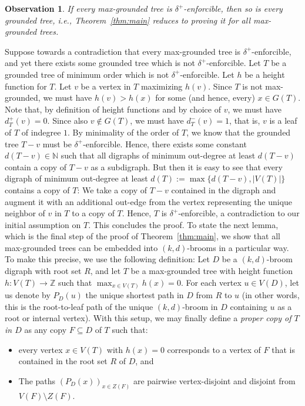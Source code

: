\documentclass[a4paper,11pt]{article}
\makeatletter
\renewenvironment{proof}[1][\proofname] {\par\pushQED{\qed}\normalfont\topsep6\p@\@plus6\p@\relax\trivlist\item[\hskip\labelsep\bfseries#1\@addpunct{.}]\ignorespaces}{\popQED\endtrivlist\@endpefalse}
\newtheorem{observation}[theorem]{\bf Observation}
\theoremstyle{definition}
\makeatother
\begin{document}
\begin{observation}\label{obs:obvious}
If every max-grounded tree is $\delta^+$-enforcible, then so is every grounded tree, i.e., Theorem~\ref{thm:main} reduces to proving it for all max-grounded trees.
\end{observation}
\begin{proof}
    Suppose towards a contradiction that every max-grounded tree is $\delta^+$-enforcible, and yet there exists some grounded tree which is not $\delta^+$-enforcible. Let $T$ be a grounded tree of minimum order which is not $\delta^+$-enforcible. Let $h$ be a height function for $T$. Let $v$ be a vertex in $T$ maximizing $h(v)$. Since $T$ is not max-grounded, we must have $h(v)>h(x)$ for some (and hence, every) $x\in G(T)$. Note that, by definition of height functions and by choice of $v$, we must have $d_T^+(v)=0$. Since also $v\notin G(T)$, we must have $d_T^-(v)=1$, that is, $v$ is a leaf of $T$ of indegree $1$. By minimality of the order of $T$, we know that the grounded tree $T-v$ must be $\delta^+$-enforcible. Hence, there exists some constant $d(T-v)\in \mathbb{N}$ such that all digraphs of minimum out-degree at least $d(T-v)$ contain a copy of $T-v$ as a subdigraph. But then it is easy to see that every digraph of minimum out-degree at least $d(T):=\max\{d(T-v),|V(T)|\}$ contains a copy of $T$: We take a copy of $T-v$ contained in the digraph and augment it with an additional out-edge from the vertex representing the unique neighbor of $v$ in $T$ to a copy of $T$. Hence, $T$ is $\delta^+$-enforcible, a contradiction to our initial assumption on $T$. This concludes the proof. 
\end{proof}
To state the next lemma, which is the final step of the proof of Theorem~\ref{thm:main}, we show that all max-grounded trees can be embedded into $(k,d)$-brooms in a particular way. To make this precise, we use the following definition: Let $D$ be a $(k,d)$-broom digraph with root set $R$, and let $T$ be a max-grounded tree with height function $h:V(T)\rightarrow \mathbb{Z}$ such that $\max_{x\in V(T)}{h(x)}=0$. For each vertex $u\in V(D)$, let us denote by $P_D(u)$ the unique shortest path in $D$ from $R$ to $u$ (in other words, this is the root-to-leaf path of the unique $(k,d)$-broom in $D$ containing $u$ as a root or internal vertex). With this setup, we may finally define a \emph{proper copy of $T$ in $D$} as any copy $F\subseteq D$ of $T$ such that:
\begin{itemize}
    \item every vertex $x\in V(T)$ with $h(x)=0$ corresponds to a vertex of $F$ that is contained in the root set $R$ of $D$, and
    \item The paths $(P_D(x))_{x\in Z(F)}$ are pairwise vertex-disjoint and disjoint from $V(F)\setminus Z(F)$. 
\end{itemize}
\end{document}
